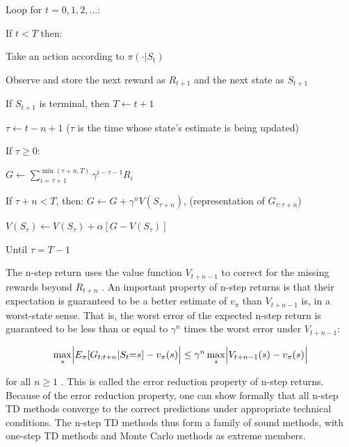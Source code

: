\documentclass{article}
\begin{document}
\hspace{.5cm} Loop for $t = 0 , 1 , 2 , \ldots$:

\hspace{1cm} If $t < T$ then:

\hspace{1.5cm} Take an action according to $\pi ( \cdot | S _ { t } )$

\hspace{1.5cm} Observe and store the next reward as $R _ { t + 1 }$ and the next state as $S _ { t + 1 }$

\hspace{1.5cm} If $S _ { t + 1 }$ is terminal, then $T \leftarrow t + 1$

\hspace{1cm} $\tau \gets t - n + 1$ ($\tau$ is the time whose state's estimate is being updated)

\hspace{1cm} If $\tau \geq 0 { \mathrm { : } }$

\hspace{1.5cm} $G \gets \sum _ { i = \tau + 1 } ^ { \operatorname* { m i n } ( \tau + n , T ) } \gamma ^ { i - \tau - 1 } R _ { i }$

\hspace{1.5cm} If $\tau + n < T$, then: $G \gets G + \gamma ^ { n } V ( S _ { \tau + n } )$, (representation of $G _ { \tau : \tau + n }$)

\hspace{1.5cm} $V ( S _ { \tau } ) \leftarrow V ( S _ { \tau } ) + \alpha \left[ G - V ( S _ { \tau } ) \right]$

\hspace{.5cm} Until $\tau = T - 1$

The n-step return uses the value function $V _ { t + n - 1 }$ to correct for the missing rewards beyond $R _ { t + n }$ . An important property of n-step returns is that their expectation is guaranteed to be a better estimate of $v _ { \pi }$ 
than $V _ { t + n - 1 }$ is, in a worst-state sense. That is, the worst error of the expected n-step return is guaranteed to be less than or equal to $\gamma ^ { n }$ times the worst error under $V _ { t + n - 1 }$:

$$
\operatorname* { m a x } _ { s } \Bigl | E _ { \pi } [ G _ { t : t + n } | S _ { t } { = } s ] - v _ { \pi } ( s ) \Bigr | \leq \gamma ^ { n } \operatorname* { m a x } _ { s } \Bigl | V _ { t + n - 1 } ( s ) - v _ { \pi } ( s ) \Bigr |
$$

for all $n \geq 1$ . This is called the error reduction property of n-step returns. Because of the error reduction property, one can show formally that all n-step TD methods converge to the correct predictions under appropriate technical conditions. 
The n-step TD methods thus form a family of sound methods, with one-step TD methods and Monte Carlo methods as extreme members.
\end{document}
